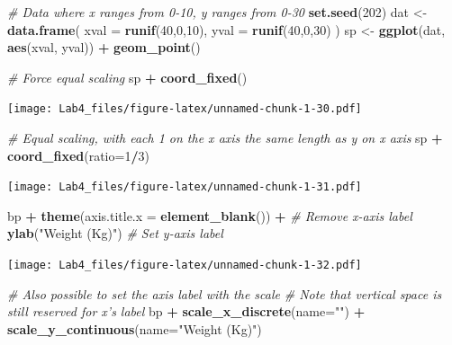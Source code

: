 \documentclass[]{article}
\newenvironment{Shaded}{\begin{snugshade}}{\end{snugshade}}
\newcommand{\KeywordTok}[1]{\textcolor[rgb]{0.13,0.29,0.53}{\textbf{#1}}}
\newcommand{\DataTypeTok}[1]{\textcolor[rgb]{0.13,0.29,0.53}{#1}}
\newcommand{\DecValTok}[1]{\textcolor[rgb]{0.00,0.00,0.81}{#1}}
\newcommand{\StringTok}[1]{\textcolor[rgb]{0.31,0.60,0.02}{#1}}
\newcommand{\CommentTok}[1]{\textcolor[rgb]{0.56,0.35,0.01}{\textit{#1}}}
\newcommand{\OperatorTok}[1]{\textcolor[rgb]{0.81,0.36,0.00}{\textbf{#1}}}
\newcommand{\NormalTok}[1]{#1}
\begin{document}
\begin{Shaded}
\begin{Highlighting}[]
\CommentTok{# Data where x ranges from 0-10, y ranges from 0-30}
\KeywordTok{set.seed}\NormalTok{(}\DecValTok{202}\NormalTok{)}
\NormalTok{dat <-}\StringTok{ }\KeywordTok{data.frame}\NormalTok{(}
    \DataTypeTok{xval =} \KeywordTok{runif}\NormalTok{(}\DecValTok{40}\NormalTok{,}\DecValTok{0}\NormalTok{,}\DecValTok{10}\NormalTok{),}
    \DataTypeTok{yval =} \KeywordTok{runif}\NormalTok{(}\DecValTok{40}\NormalTok{,}\DecValTok{0}\NormalTok{,}\DecValTok{30}\NormalTok{)}
\NormalTok{)}
\NormalTok{sp <-}\StringTok{ }\KeywordTok{ggplot}\NormalTok{(dat, }\KeywordTok{aes}\NormalTok{(xval, yval)) }\OperatorTok{+}\StringTok{ }\KeywordTok{geom_point}\NormalTok{()}

\CommentTok{# Force equal scaling}
\NormalTok{sp }\OperatorTok{+}\StringTok{ }\KeywordTok{coord_fixed}\NormalTok{()}
\end{Highlighting}
\end{Shaded}

\texttt{[image: Lab4\_files/figure-latex/unnamed-chunk-1-30.pdf]}

\begin{Shaded}
\begin{Highlighting}[]
\CommentTok{# Equal scaling, with each 1 on the x axis the same length as y on x axis}
\NormalTok{sp }\OperatorTok{+}\StringTok{ }\KeywordTok{coord_fixed}\NormalTok{(}\DataTypeTok{ratio=}\DecValTok{1}\OperatorTok{/}\DecValTok{3}\NormalTok{)}
\end{Highlighting}
\end{Shaded}

\texttt{[image: Lab4\_files/figure-latex/unnamed-chunk-1-31.pdf]}

\begin{Shaded}
\begin{Highlighting}[]
\NormalTok{bp }\OperatorTok{+}\StringTok{ }\KeywordTok{theme}\NormalTok{(}\DataTypeTok{axis.title.x =} \KeywordTok{element_blank}\NormalTok{()) }\OperatorTok{+}\StringTok{   }\CommentTok{# Remove x-axis label}
\StringTok{     }\KeywordTok{ylab}\NormalTok{(}\StringTok{"Weight (Kg)"}\NormalTok{)                       }\CommentTok{# Set y-axis label}
\end{Highlighting}
\end{Shaded}

\texttt{[image: Lab4\_files/figure-latex/unnamed-chunk-1-32.pdf]}

\begin{Shaded}
\begin{Highlighting}[]
\CommentTok{# Also possible to set the axis label with the scale}
\CommentTok{# Note that vertical space is still reserved for x's label}
\NormalTok{bp }\OperatorTok{+}\StringTok{ }\KeywordTok{scale_x_discrete}\NormalTok{(}\DataTypeTok{name=}\StringTok{""}\NormalTok{) }\OperatorTok{+}
\StringTok{     }\KeywordTok{scale_y_continuous}\NormalTok{(}\DataTypeTok{name=}\StringTok{"Weight (Kg)"}\NormalTok{)}
\end{Highlighting}
\end{Shaded}
\end{document}
